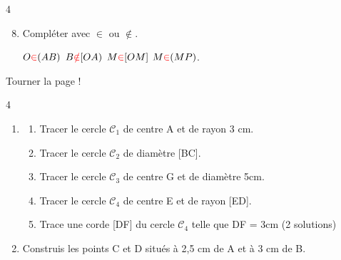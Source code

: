 \documentclass[a4paper]{book}
\begin{document}
{\begin{exerciceNote}{4}
        \begin{enumerate}
            \setcounter{enumi}{7}
            \item Compléter avec $\in$ ou $\notin$.

            $O \textcolor{red}{\in} (AB)$ \quad $B \textcolor{red}{\notin} [OA)$ \quad $M \textcolor{red}{\in} [OM]$ \quad $M \textcolor{red}{\in} (MP)$.
        \end{enumerate}
    \end{exerciceNote}

\vfill
\hfill Tourner la page !

\newpage


    \begin{exerciceNote}{4}
        \begin{enumerate}
            \item 
        
            \begin{enumerate}
                \item Tracer le cercle $\mathcal{C}_1$ de centre A et de rayon 3 cm.
    
                \item Tracer le cercle $\mathcal{C}_2$ de diamètre [BC].
    
                \item Tracer le cercle $\mathcal{C}_3$ de centre G et de diamètre 5cm.
    
                \item Tracer le cercle $\mathcal{C}_4$ de centre E et de rayon [ED].
    
                \item Trace une corde [DF] du cercle $\mathcal{C}_4$ telle que DF = 3cm (2 solutions)
            \end{enumerate}   
        \end{enumerate}

        
        \begin{enumerate}
            \setcounter{enumi}{1}
            \item Construis les points C et D situés à 2,5 cm de A et à 3 cm de B.
        \end{enumerate}

        \begin{center}
        \end{center}
    \end{exerciceNote}

}
\end{document}
